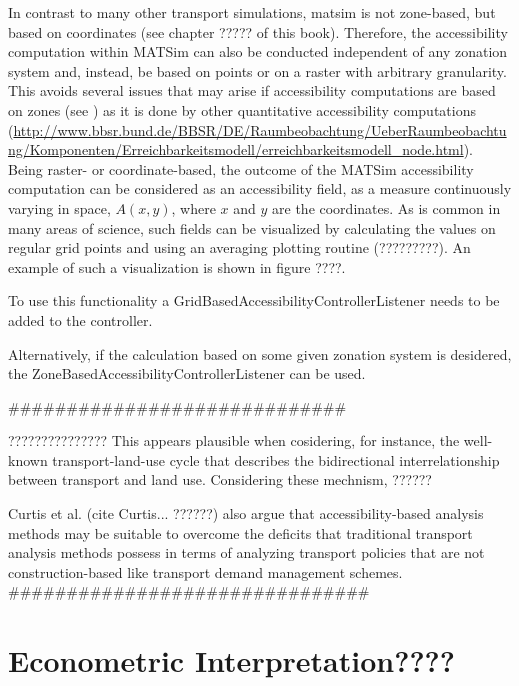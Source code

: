 In contrast to many other transport simulations, \gls{matsim} is not zone-based, but based on coordinates (see 
chapter ????? of this book). Therefore, the accessibility computation within MATSim can also be conducted independent 
of any zonation system and, instead, be based on points or on a raster with arbitrary granularity. This avoids 
several issues that may arise if accessibility computations are based on zones 
(see \citep[e.g.,][]{NicolaiNagel2012HiResAccessibilityMethodInBook}) as it is done by other quantitative 
accessibility computations 
%
%
(\url{http://www.bbsr.bund.de/BBSR/DE/Raumbeobachtung/UeberRaumbeobachtung/Komponenten/Erreichbarkeitsmodell/erreichbarkeitsmodell_node.html}). Being raster- or coordinate-based, the outcome of the MATSim accessibility computation can be considered as 
an accessibility field,
\ie as a measure continuously varying in space, $A(x,y)$, where $x$ and $y$
are the coordinates. As is common in many areas of science, such
fields can be visualized by calculating the values on regular grid
points and using an averaging plotting routine (?????????). An example of such a visualization is shown in figure ????.

To use this functionality a GridBasedAccessibilityControllerListener needs to be added to the controller.

Alternatively, if the calculation based on some given zonation system is desidered, the ZoneBasedAccessibilityControllerListener can be used.




#############################

???????????????
This appears plausible when cosidering, for instance, the well-known transport-land-use cycle that describes the 
bidirectional interrelationship between transport and land use. Considering these mechnism, ?????? 

Curtis et al. (cite Curtis... ??????) also argue that accessibility-based analysis methods may be suitable to overcome 
the deficits that traditional transport analysis methods possess in terms of analyzing transport policies that are not 
construction-based like transport demand management schemes.
###############################





\section{Econometric Interpretation????}

